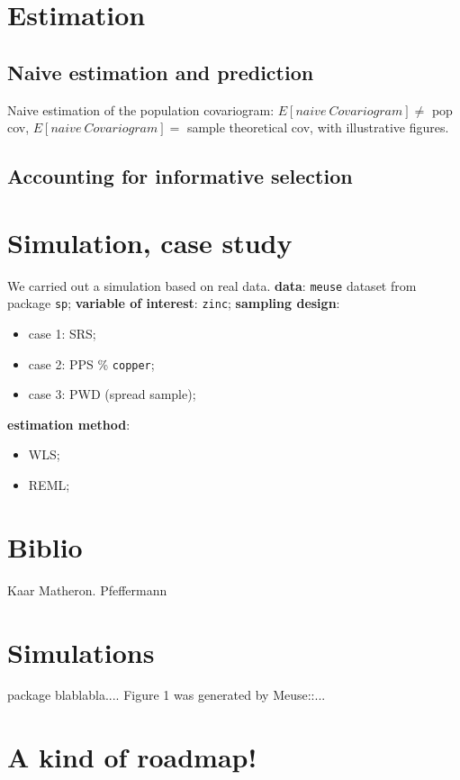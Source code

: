 \documentclass[12pt]{article}
\theoremstyle{definition}
\theoremstyle{remark}
\begin{document}
\section{Estimation}
\subsection{Naive estimation and prediction}
 Naive estimation of the population covariogram:
 $E[naive~Covariogram]\neq$ pop cov,
 $E[naive~Covariogram]=$ sample theoretical cov, 
 with illustrative figures.
\subsection{Accounting for informative selection}

\section{Simulation, case study}
We carried out a simulation based on real data.
\textbf{data}: \texttt{meuse} dataset from package \texttt{sp};
\textbf{variable of interest}: \texttt{zinc};
\textbf{sampling design}:
    \begin{itemize}
        \item case 1: SRS;
        \item case 2: PPS \% \texttt{copper};
        \item case 3: PWD (spread sample);
    \end{itemize}
 \textbf{estimation method}:
    \begin{itemize}
        \item WLS;
        \item REML;
    \end{itemize}
\section{Biblio}

Kaar
Matheron.
Pfeffermann


\section{Simulations}

package blablabla....
Figure 1 was generated by Meuse::...

\appendix
\section{A kind of roadmap!}
\end{document}
